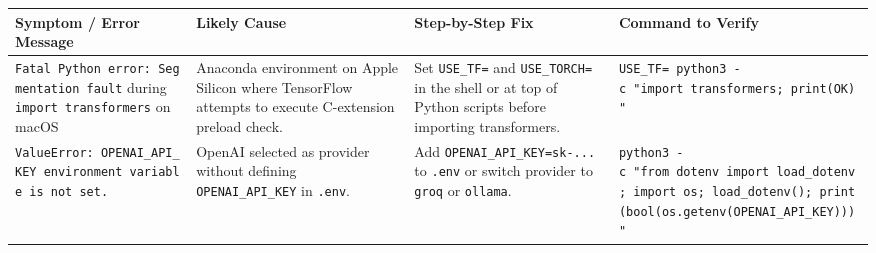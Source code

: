 \documentclass[
]{article}
\begin{document}
\begingroup\footnotesize
\begin{longtable}[]{@{}
  >{\raggedright\arraybackslash\sloppy}p{}
  >{\raggedright\arraybackslash\sloppy}p{}
  >{\raggedright\arraybackslash\sloppy}p{}
  >{\raggedright\arraybackslash\sloppy}p{}@{}}
\toprule\noalign{}
\begin{minipage}[b]{\linewidth}\raggedright
Symptom / Error Message
\end{minipage} & \begin{minipage}[b]{\linewidth}\raggedright
Likely Cause
\end{minipage} & \begin{minipage}[b]{\linewidth}\raggedright
Step-by-Step Fix
\end{minipage} & \begin{minipage}[b]{\linewidth}\raggedright
Command to Verify
\end{minipage} \\
\midrule\noalign{}
\endhead
\bottomrule\noalign{}
\endlastfoot
\texttt{Fatal\ \allowbreak Python\ \allowbreak error:\ \allowbreak Segmentation\ \allowbreak fault} during
\texttt{import\ \allowbreak transformers} on macOS & Anaconda environment on Apple
Silicon where TensorFlow attempts to execute C-extension preload check.
& Set \texttt{USE\_\allowbreak TF=\allowbreak 0} and \texttt{USE\_\allowbreak TORCH=\allowbreak 1} in the shell or at
top of Python scripts before importing transformers. &
\texttt{USE\_\allowbreak TF=\allowbreak 0\ \allowbreak python3\ \allowbreak -c\ \allowbreak "import\ \allowbreak transformers;\ \allowbreak print(\allowbreak \textquotesingle{}OK\textquotesingle{})\allowbreak "} \\
\texttt{ValueError:\ \allowbreak OPENAI\_\allowbreak API\_\allowbreak KEY\ \allowbreak environment\ \allowbreak variable\ \allowbreak is\ \allowbreak not\ \allowbreak set.}
& OpenAI selected as provider without defining \texttt{OPENAI\_\allowbreak API\_\allowbreak KEY}
in \texttt{.\allowbreak env}. & Add \texttt{OPENAI\_\allowbreak API\_\allowbreak KEY=\allowbreak sk-.\allowbreak .\allowbreak .} to
\texttt{.\allowbreak env} or switch provider to \texttt{groq} or \texttt{ollama}. &
\texttt{python3\ \allowbreak -c\ \allowbreak "from\ \allowbreak dotenv\ \allowbreak import\ \allowbreak load\_\allowbreak dotenv;\ \allowbreak import\ \allowbreak os;\ \allowbreak load\_\allowbreak dotenv(\allowbreak )\allowbreak ;\ \allowbreak print(\allowbreak bool(\allowbreak os.\allowbreak getenv(\allowbreak \textquotesingle{}OPENAI\_\allowbreak API\_\allowbreak KEY\textquotesingle{})\allowbreak )\allowbreak )\allowbreak "} \\

\end{longtable}
\end{document}
